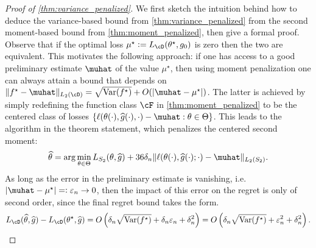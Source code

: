 \documentclass[11pt]{article} %
\newcommand{\pref}[1]{\cref{#1}}
\newcommand{\pfref}[1]{Proof of \pref{#1}}
\theoremstyle{theorem}  %
\theoremstyle{plain}
\DeclarePairedDelimiter{\abs}{\lvert}{\rvert} %
\newcommand{\veps}{\varepsilon}
\newcommand{\ldef}{\vcentcolon=}
\newcommand{\rdef}{=\vcentcolon}
\newcommand{\wh}[1]{\widehat{#1}}
\newcommand{\poprisk}{L_{\cD}}
\newcommand{\var}{\mathrm{Var}}
\newcommand{\estone}{\wh{g}}
\newcommand{\esttwo}{\wh{\theta}}
\newcommand{\target}{\Theta}
\newcommand{\besttwo}{\theta^{\star}}
\newcommand{\gtone}{g_0}
\newcommand{\sampletwo}{S_2}
\renewcommand{\hat}[1]{\wh{#1}}
\begin{document}
\begin{proof}[\pfref{thm:variance_penalized}]
  We first sketch the intuition behind how to deduce the
  variance-based bound from \pref{thm:variance_penalized} from the
  second moment-based bound from \pref{thm:moment_penalized}, then
  give a formal proof. Observe that if the optimal loss $\mu^\star\ldef{}\poprisk(\besttwo,\gtone)$ is zero then the two are equivalent. This motivates the following approach: if one has access to a good preliminary estimate $\muhat$ of the value $\mu^\star$, then using moment penalization one can always attain a bound that depends on $\|f^\star - \muhat\|_{L_2(\cD)} = \sqrt{\var(f^\star)} + O(\abs{\muhat - \mu^\star})$. The latter is achieved by simply redefining the function class $\cF$ in \pref{thm:moment_penalized} to be the centered class of losses $\{\ell(\theta(\cdot), \estone(\cdot), \cdot)-\muhat: \theta \in \target\}$. This leads to the algorithm in the theorem statement, which penalizes the centered second moment:
\begin{equation}
\hat{\theta} = \arg\min_{\theta\in \target} L_{\sampletwo}(\theta, \hat{g}) + 36 \delta_n \|\ell(\theta(\cdot),\estone(\cdot);\cdot)-\muhat\|_{L_2(\sampletwo)}.
\end{equation}
As long as the error in the preliminary estimate is vanishing,
i.e. $\abs{\muhat - \mu^\star}\rdef\veps_n\rightarrow 0$, then the
impact of this error on the regret is only of second order, since the
final regret bound takes the form.
\begin{equation}
\label{eq:variance_penalized}
\poprisk(\esttwo, \estone) - \poprisk(\besttwo, \estone) = O\left( \delta_n \sqrt{\var(f^\star)} + \delta_n\veps_n + \delta_n^2\right) = O\left( \delta_n \sqrt{\var(f^\star)}+\veps_n^{2}+\delta_n^{2}\right).
\end{equation}


\end{proof}
\end{document}
